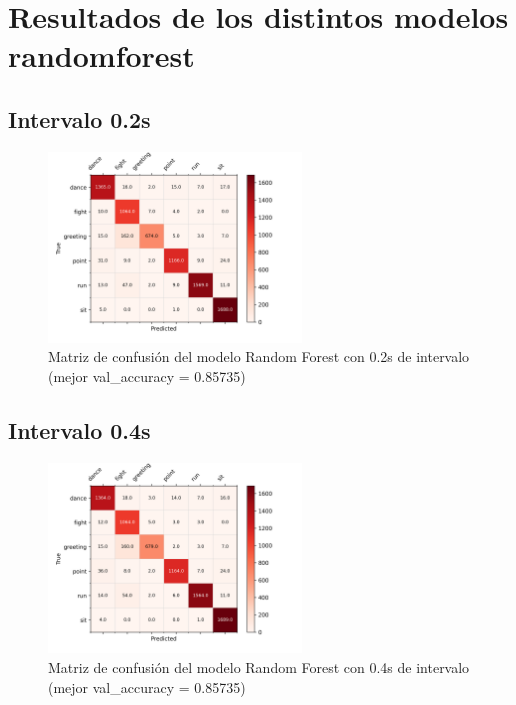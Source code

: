\chapter{Resultados de los distintos modelos \gls{randomforest}}
\label{appendix:resultadosRF}

\section{Intervalo 0.2s}

\begin{figure}[H]
    \centering
    \includegraphics[width=0.6\textwidth]{Imagenes/Bitmap/CM_best_rf_0.2.png}
    \caption{Matriz de confusión del modelo Random Forest con 0.2s de intervalo (mejor val\_accuracy = 0.85735)}
    \label{fig:rf-0.2-matriz}
\end{figure}

\section{Intervalo 0.4s}

\begin{figure}[H]
    \centering
    \includegraphics[width=0.6\textwidth]{Imagenes/Bitmap/CM_best_rf_0.4.png}
    \caption{Matriz de confusión del modelo Random Forest con 0.4s de intervalo (mejor val\_accuracy = 0.85735)}
    \label{fig:rf-0.4-matriz}
\end{figure}

